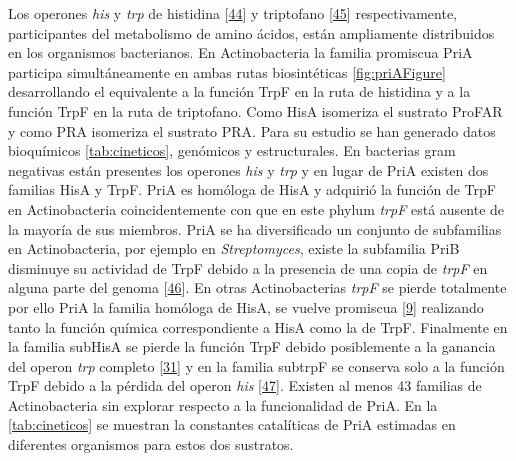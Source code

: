 \documentclass[12pt,twoside]{reedthesis}
\begin{document}
  Los operones \emph{his} y \emph{trp} de histidina
  {[}\protect\hyperlink{ref-fondi_evolution_2009}{44}{]} y triptofano
  {[}\protect\hyperlink{ref-merino_evolution_2008}{45}{]} respectivamente,
  participantes del metabolismo de amino ácidos, están ampliamente
  distribuidos en los organismos bacterianos. En Actinobacteria la familia
  promiscua PriA participa simultáneamente en ambas rutas biosintéticas
  \autoref{fig:priAFigure} desarrollando el equivalente a la función TrpF
  en la ruta de histidina y a la función TrpF en la ruta de triptofano.
  Como HisA isomeriza el sustrato ProFAR y como PRA isomeriza el sustrato
  PRA. Para su estudio se han generado datos bioquímicos
  \autoref{tab:cineticos}, genómicos y estructurales. En bacterias gram
  negativas están presentes los operones \emph{his} y \emph{trp} y en
  lugar de PriA existen dos familias HisA y TrpF. PriA es homóloga de HisA
  y adquirió la función de TrpF en Actinobacteria coincidentemente con que
  en este phylum \emph{trpF} está ausente de la mayoría de sus miembros.
  PriA se ha diversificado un conjunto de subfamilias en Actinobacteria,
  por ejemplo en \emph{Streptomyces}, existe la subfamilia PriB disminuye
  su actividad de TrpF debido a la presencia de una copia de \emph{trpF}
  en alguna parte del genoma
  {[}\protect\hyperlink{ref-verduzco-castro_co-occurrence_2016}{46}{]}. En
  otras Actinobacterias \emph{trpF} se pierde totalmente por ello PriA la
  familia homóloga de HisA, se vuelve promiscua
  {[}\protect\hyperlink{ref-baronagomez_occurrence_2003}{9}{]} realizando
  tanto la función química correspondiente a HisA como la de TrpF.
  Finalmente en la familia subHisA se pierde la función TrpF debido
  posiblemente a la ganancia del operon \emph{trp} completo
  {[}\protect\hyperlink{ref-noda-garcia_evolution_2013}{31}{]} y en la
  familia subtrpF se conserva solo a la función TrpF debido a la pérdida
  del operon \emph{his}
  {[}\protect\hyperlink{ref-juarez-vazquez_evolution_2017}{47}{]}. Existen
  al menos 43 familias de Actinobacteria sin explorar respecto a la
  funcionalidad de PriA. En la \autoref{tab:cineticos} se muestran la
  constantes catalíticas de PriA estimadas en diferentes organismos para
  estos dos sustratos.
  
  \clearpage    
  
\end{document}

